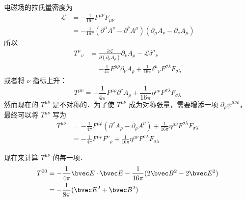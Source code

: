 电磁场的拉氏量密度为
\begin{equation}
\begin{aligned}
\mathcal{L}&=-\frac{1}{16\pi}F^{\mu\nu} F_{\mu\nu}\\
&=-\frac{1}{16\pi}(\partial^\mu A^\nu-\partial^\nu A^\mu)(\partial_\mu A_\nu-\partial_\nu A_\mu)
\end{aligned}
\end{equation}
所以
\begin{equation}
\begin{aligned}
T^\mu{}_\nu&=\frac{\partial \mathcal{L}}{\partial (\partial_\mu A_\rho)}\partial_\nu A_\rho-\mathcal{L}\delta^\mu{}_\nu\\
&=-\frac{1}{4\pi}F^{\mu\rho}\partial_\nu A_\rho+\frac{1}{16\pi}\delta^\mu{}_\nu F^{\sigma\lambda}F_{\sigma\lambda}
\end{aligned}
\end{equation}
或者将 $\nu$ 指标上升：
\begin{equation}
T^{\mu\nu}=-\frac{1}{4\pi}F^{\mu\rho}\partial^\nu A_\rho + \frac{1}{16\pi} \eta^{\mu\nu}F^{\sigma\lambda}F_{\sigma\lambda}
\end{equation}
然而现在的 $T^{\mu\nu}$ 是不对称的．为了使 $T^{\mu\nu}$ 成为对称张量，需要增添一项 $\partial_\rho \psi^{\mu\nu\rho}$，最终可以将 $T^{\mu\nu}$ 写为
\begin{equation}
\begin{aligned}
T^{\mu\nu}&=-\frac{1}{4\pi}F^{\mu\rho}(\partial^\nu A_\rho-\partial_\rho A^\nu) + \frac{1}{16\pi} \eta^{\mu\nu}F^{\sigma\lambda}F_{\sigma\lambda}\\
&=-\frac{1}{4\pi}F^{\mu\rho}F^\nu{}_\rho+\frac{1}{16\pi} \eta^{\mu\nu}F^{\sigma\lambda}F_{\sigma\lambda}
\end{aligned}
\end{equation}

现在来计算 $T^{\mu\nu}$ 的每一项．
\begin{equation}
\begin{aligned}
T^{00}&=-\frac{1}{4\pi}\bvec E \cdot \bvec E-\frac{1}{16\pi}(2\bvec B^2-2\bvec E^2)\\
&=-\frac{1}{8\pi}(\bvec E^2+\bvec B^2)
\end{aligned}
\end{equation}

